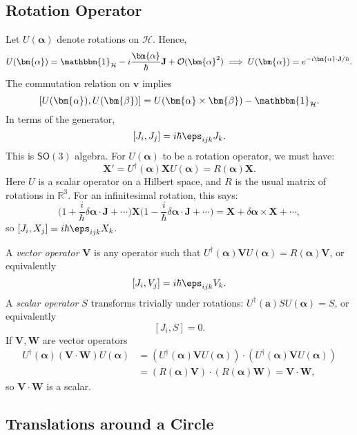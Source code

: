 \documentclass[12pt]{article}
\begin{document}
\subsection{Rotation Operator}
\label{sub:rot_op}

Let $U(\bm{\alpha})$ denote rotations on $\mathcal{H}$. Hence,
\[
U(\bm{\alpha}) = \mathbbm{1}_{\mathcal{H}} - i \frac{\bm{\alpha}}{\hbar} \mathbf{J} + \mathcal{O}(\bm{\alpha}^2) \implies U(\bm{\alpha}) = e^{-i \bm{\alpha} \cdot \mathbf{J} /\hbar}.
\]
The commutation relation on $\mathbf{v}$ implies
\[
	[U(\bm{\alpha}), U(\bm{\beta})] = U(\bm{\alpha} \times \bm{\beta}) - \mathbbm{1}_{\mathcal{H}}.
\]
In terms of the generator,
\[
	[J_i, J_j] = i \hbar \eps_{ijk} J_k.
\]
This is $\mathsf{SO}(3)$ algebra.
For $U(\bm{\alpha})$ to be a rotation operator, we must have:
\[
	\mathbf{X}' = U^{\dagger}(\bm{\alpha})\mathbf{X} U(\bm{\alpha}) = R(\bm{\alpha})\mathbf{X}.
\]
Here $U$ is a scalar operator on a Hilbert space, and $R$ is the usual matrix of rotations in $\mathbb{R}^3$. For an infinitesimal rotation, this says:
\[
	\biggl(1 + \frac{i}{\hbar} \delta \bm{\alpha} \cdot \mathbf{J} + \cdots \biggr) \mathbf{X} \biggl(1 - \frac{i}{\hbar} \delta \bm{\alpha} \cdot \mathbf{J} + \cdots \biggr) = \mathbf{X} + \delta \bm{\alpha} \times \mathbf{X} + \cdots,
\]
so $[J_i, X_j] = i\hbar \eps_{ijk} X_k$.

A \emph{vector operator} $\mathbf{V}$ is any operator such that $U^{\dagger}(\bm{\alpha})\mathbf{V} U(\bm{\alpha}) = R(\bm{\alpha})\mathbf{V}$, or equivalently
\[
	[J_i, V_j] = i \hbar \eps_{ijk} V_k.
\]
A \emph{scalar operator} $S$ transforms trivially under rotations: $U^{\dagger}(\bm{a})S U(\bm{\alpha}) = S$, or equivalently
\[
	[J_i, S] = 0.
\]
If $\mathbf{V}, \mathbf{W}$ are vector operators
\begin{align*}
	U^{\dagger}(\bm{\alpha})(\mathbf{V} \cdot \mathbf{W}) U(\bm{\alpha}) &= (U^{\dagger}(\bm{\alpha})\mathbf{V} U(\bm{\alpha})) \cdot (U^{\dagger}(\bm{\alpha}) \mathbf{V} U(\bm{\alpha})) \\
									     &= (R(\bm{\alpha}) \mathbf{V}) \cdot (R(\bm{\alpha}) \mathbf{W}) = \mathbf{V} \cdot \mathbf{W},
\end{align*}
so $\mathbf{V} \cdot \mathbf{W}$ is a scalar.

\subsection{Translations around a Circle}
\label{sub:trans_circle}
\end{document}
